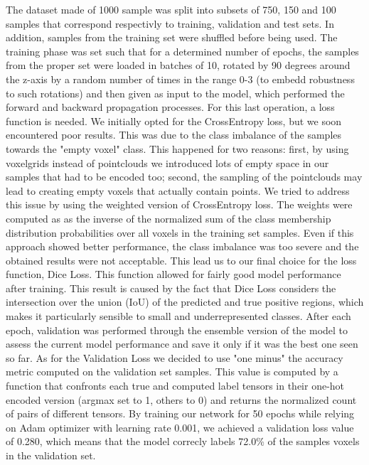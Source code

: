 The dataset made of 1000 sample was split into subsets of 750, 150 and 100 samples that correspond respectivly
to training, validation and test sets. In addition, samples from the training set were shuffled before being used.
The training phase was set such that for a determined number of epochs, the samples from the proper
set were loaded in batches of 10, rotated by 90 degrees around the z-axis by a random number
of times in the range 0-3 (to embedd robustness to such rotations) and then given as 
input to the model, which performed the forward and backward propagation processes.
For this last operation, a loss function is needed.
We initially opted for the CrossEntropy loss, but we soon encountered poor results. This was due to the class imbalance of the
samples towards the "empty voxel" class. This happened for two reasons: first, by using voxelgrids instead of pointclouds
we introduced lots of empty space in our samples that had to be encoded too; second, the sampling of the pointclouds may lead 
to creating empty voxels that actually contain points.
We tried to address this issue by using the weighted version of CrossEntropy loss.
The weights were computed as as the inverse of the normalized sum of the class membership distribution probabilities 
over all voxels in the training set samples.
Even if this approach showed better performance, the class imbalance was too severe and the obtained results were not acceptable.
This lead us to our final choice for the loss function, Dice Loss.
This function allowed for fairly good model performance after training. This result is caused by the fact that Dice Loss considers 
the intersection over the union (IoU) of the predicted and true positive regions, which makes it particularly sensible to small 
and underrepresented classes.
After each epoch, validation was performed through the ensemble version of the model
to assess the current model performance and save it only if it was the best one seen so far. 
As for the Validation Loss we decided to use "one minus" the accuracy metric computed on the validation set samples.
This value is computed by a function that confronts each true and computed label tensors in their one-hot encoded version 
(argmax set to 1, others to 0) and returns the normalized count of pairs of different tensors.
By training our network for 50 epochs while relying on Adam optimizer with learning rate 0.001, we achieved a validation loss value of 0.280, which
means that the model correcly labels 72.0\% of the samples voxels in the validation set.